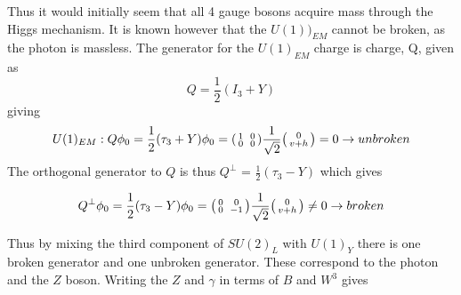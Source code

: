 Thus it would initially seem that all 4 gauge bosons acquire mass through the Higgs mechanism.
It is known however that the $U(1))_{EM}$ cannot be broken, as the photon is massless. The generator for the $U(1)_{EM}$ charge is charge, Q, given as
\begin{equation}
  Q = \frac{1}{2}(I_{3}+Y)
\end{equation}
giving
\begin{equation}
  U(1)_{EM}: Q\phi_{0} = \frac{1}{2}(\tau_{3} + Y)\phi_{0} = \begin{psmallmatrix}1&&0\\0&&0\end{psmallmatrix}\frac{1}{\sqrt{2}} \begin{psmallmatrix}0\\v+h\end{psmallmatrix}= 0 \to unbroken\\
\end{equation}
The orthogonal generator to $Q$ is thus $Q^{\perp}$ = $\frac{1}{2}(\tau_{3} - Y)$ which gives

\begin{equation}
 Q^{\perp}\phi_{0} = \frac{1}{2}(\tau_{3} - Y)\phi_{0} = \begin{psmallmatrix}0&&0\\0&&-1\end{psmallmatrix}\frac{1}{\sqrt{2}} \begin{psmallmatrix}0\\v+h\end{psmallmatrix}\neq 0 \to broken\\
\end{equation}

Thus by mixing the third component of $SU(2)_{L}$ with $U(1)_{Y}$ there is one broken generator and one unbroken generator. These correspond to the photon and the $Z$ boson. Writing the $Z$ and $\gamma$ in terms of $B$ and $W^{3}$ gives


